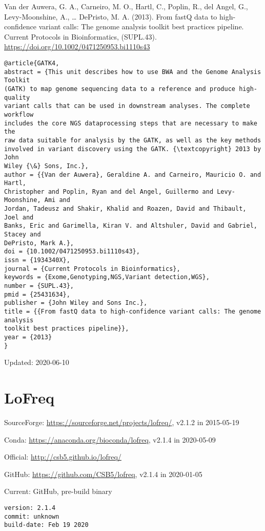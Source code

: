 \documentclass[]{article}
\begin{document}
Van der Auwera, G. A., Carneiro, M. O., Hartl, C., Poplin, R., del Angel, G., Levy-Moonshine, A., … DePristo, M. A. (2013). From fastQ data to high-confidence variant calls: The genome analysis toolkit best practices pipeline. Current Protocols in Bioinformatics, (SUPL.43). \url{https://doi.org/10.1002/0471250953.bi1110s43}

\begin{verbatim}
@article{GATK4,
abstract = {This unit describes how to use BWA and the Genome Analysis Toolkit
(GATK) to map genome sequencing data to a reference and produce high-quality
variant calls that can be used in downstream analyses. The complete workflow
includes the core NGS dataprocessing steps that are necessary to make the
raw data suitable for analysis by the GATK, as well as the key methods
involved in variant discovery using the GATK. {\textcopyright} 2013 by John
Wiley {\&} Sons, Inc.},
author = {{Van der Auwera}, Geraldine A. and Carneiro, Mauricio O. and Hartl,
Christopher and Poplin, Ryan and del Angel, Guillermo and Levy-Moonshine, Ami and
Jordan, Tadeusz and Shakir, Khalid and Roazen, David and Thibault, Joel and
Banks, Eric and Garimella, Kiran V. and Altshuler, David and Gabriel, Stacey and
DePristo, Mark A.},
doi = {10.1002/0471250953.bi1110s43},
issn = {1934340X},
journal = {Current Protocols in Bioinformatics},
keywords = {Exome,Genotyping,NGS,Variant detection,WGS},
number = {SUPL.43},
pmid = {25431634},
publisher = {John Wiley and Sons Inc.},
title = {{From fastQ data to high-confidence variant calls: The genome analysis
toolkit best practices pipeline}},
year = {2013}
}
\end{verbatim}

Updated: 2020-06-10


\section{LoFreq}

SourceForge: \url{https://sourceforge.net/projects/lofreq/}, v2.1.2 in 2015-05-19

Conda: \url{https://anaconda.org/bioconda/lofreq}, v2.1.4 in 2020-05-09

Official: \url{http://csb5.github.io/lofreq/}

GitHub: \url{https://github.com/CSB5/lofreq}, v2.1.4 in 2020-01-05

Current: GitHub, pre-build binary

\begin{verbatim}
version: 2.1.4
commit: unknown
build-date: Feb 19 2020
\end{verbatim}
\end{document}
